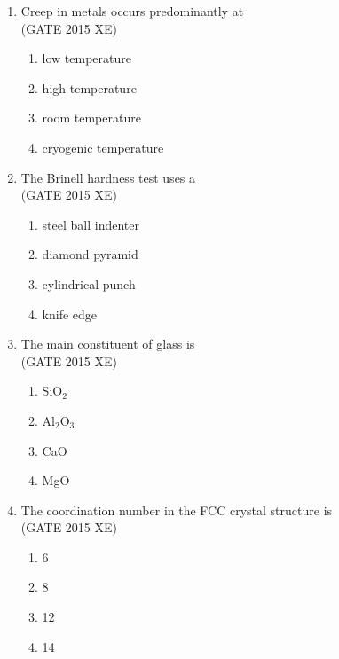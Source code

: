 \documentclass[journal,12pt,onecolumn]{IEEEtran}
\begin{document}
\begin{enumerate}
\item Creep in metals occurs predominantly at  \\
\hfill{(GATE 2015 XE)} 
\begin{multicols}{4}
\begin{enumerate}
\item low temperature
\item high temperature
\item room temperature
\item cryogenic temperature
\end{enumerate}
\end{multicols}

\newpage

\item The Brinell hardness test uses a \\
\hfill{(GATE 2015 XE)} 
\begin{multicols}{2}
\begin{enumerate}
\item steel ball indenter
\item diamond pyramid
\item cylindrical punch
\item knife edge
\end{enumerate}
\end{multicols}

\item The main constituent of glass is  \\
\hfill{(GATE 2015 XE)} 
\begin{multicols}{4}
\begin{enumerate}
\item SiO$_2$
\item Al$_2$O$_3$
\item CaO
\item MgO
\end{enumerate}
\end{multicols}


\item The coordination number in the FCC crystal structure is  \\
\hfill{(GATE 2015 XE)} 
\begin{multicols}{4}
\begin{enumerate}
\item 6
\item 8
\item 12
\item 14
\end{enumerate}
\end{multicols}


\end{enumerate}
\end{document}
